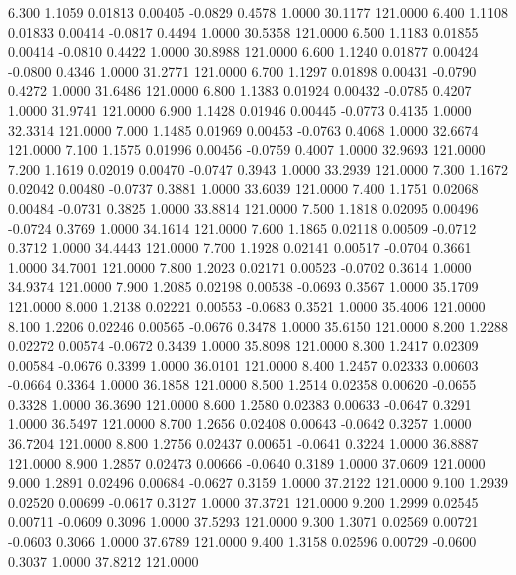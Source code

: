    6.300   1.1059   0.01813   0.00405  -0.0829   0.4578   1.0000  30.1177 121.0000
   6.400   1.1108   0.01833   0.00414  -0.0817   0.4494   1.0000  30.5358 121.0000
   6.500   1.1183   0.01855   0.00414  -0.0810   0.4422   1.0000  30.8988 121.0000
   6.600   1.1240   0.01877   0.00424  -0.0800   0.4346   1.0000  31.2771 121.0000
   6.700   1.1297   0.01898   0.00431  -0.0790   0.4272   1.0000  31.6486 121.0000
   6.800   1.1383   0.01924   0.00432  -0.0785   0.4207   1.0000  31.9741 121.0000
   6.900   1.1428   0.01946   0.00445  -0.0773   0.4135   1.0000  32.3314 121.0000
   7.000   1.1485   0.01969   0.00453  -0.0763   0.4068   1.0000  32.6674 121.0000
   7.100   1.1575   0.01996   0.00456  -0.0759   0.4007   1.0000  32.9693 121.0000
   7.200   1.1619   0.02019   0.00470  -0.0747   0.3943   1.0000  33.2939 121.0000
   7.300   1.1672   0.02042   0.00480  -0.0737   0.3881   1.0000  33.6039 121.0000
   7.400   1.1751   0.02068   0.00484  -0.0731   0.3825   1.0000  33.8814 121.0000
   7.500   1.1818   0.02095   0.00496  -0.0724   0.3769   1.0000  34.1614 121.0000
   7.600   1.1865   0.02118   0.00509  -0.0712   0.3712   1.0000  34.4443 121.0000
   7.700   1.1928   0.02141   0.00517  -0.0704   0.3661   1.0000  34.7001 121.0000
   7.800   1.2023   0.02171   0.00523  -0.0702   0.3614   1.0000  34.9374 121.0000
   7.900   1.2085   0.02198   0.00538  -0.0693   0.3567   1.0000  35.1709 121.0000
   8.000   1.2138   0.02221   0.00553  -0.0683   0.3521   1.0000  35.4006 121.0000
   8.100   1.2206   0.02246   0.00565  -0.0676   0.3478   1.0000  35.6150 121.0000
   8.200   1.2288   0.02272   0.00574  -0.0672   0.3439   1.0000  35.8098 121.0000
   8.300   1.2417   0.02309   0.00584  -0.0676   0.3399   1.0000  36.0101 121.0000
   8.400   1.2457   0.02333   0.00603  -0.0664   0.3364   1.0000  36.1858 121.0000
   8.500   1.2514   0.02358   0.00620  -0.0655   0.3328   1.0000  36.3690 121.0000
   8.600   1.2580   0.02383   0.00633  -0.0647   0.3291   1.0000  36.5497 121.0000
   8.700   1.2656   0.02408   0.00643  -0.0642   0.3257   1.0000  36.7204 121.0000
   8.800   1.2756   0.02437   0.00651  -0.0641   0.3224   1.0000  36.8887 121.0000
   8.900   1.2857   0.02473   0.00666  -0.0640   0.3189   1.0000  37.0609 121.0000
   9.000   1.2891   0.02496   0.00684  -0.0627   0.3159   1.0000  37.2122 121.0000
   9.100   1.2939   0.02520   0.00699  -0.0617   0.3127   1.0000  37.3721 121.0000
   9.200   1.2999   0.02545   0.00711  -0.0609   0.3096   1.0000  37.5293 121.0000
   9.300   1.3071   0.02569   0.00721  -0.0603   0.3066   1.0000  37.6789 121.0000
   9.400   1.3158   0.02596   0.00729  -0.0600   0.3037   1.0000  37.8212 121.0000
